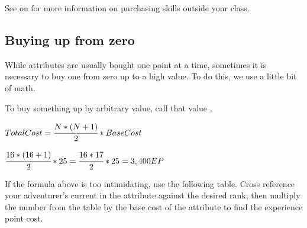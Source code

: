 \begin{multicols*}{2}

See  on  for more information on purchasing skills outside your class.
\subsection{Buying up from zero}
While attributes are usually bought one point at a time, sometimes it is necessary to buy one from zero up to a high value. To do this, we use a little bit of math.

To buy something up by arbitrary value, call that value ,
\begin{normboxc}
\large
$Total Cost = \cfrac{N * (N+1)}{2} * Base Cost$
\end{normboxc}

\begin{normboxc}
\large
$\cfrac{16 * (16+1)}{2} * 25 = \cfrac{16*17}{2} * 25 = 3,400 EP$
\end{normboxc}

If the formula above is too intimidating, use the following table. Cross reference your adventurer's current  in the attribute against the desired rank, then multiply the number from the table by the base cost of the attribute to find the experience point cost.
\end{multicols*}
